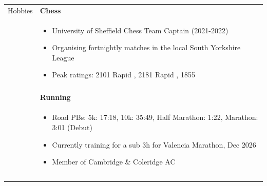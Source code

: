 \documentclass[11pt]{article}
\begin{document}
\begin{minipage}[t][0pt]{\linewidth}
\begin{tabular}[t]{p{2cm} p{14cm}}
	               {Hobbies}           &
	               \textbf{Chess}                                                                                                                                                                                                                                                                                                                                     \\ &
	               \begin{itemize}
		               \renewcommand{\labelitemi}{$\diamond$}
		               \item University of Sheffield Chess Team Captain (2021-2022)
		               \item Organising fortnightly matches in the local South Yorkshire League
		               \item Peak ratings: 2101 Rapid \href{https://www.chess.com/member/jamesluong}{\color{Blue}{chess.com}}, 2181 Rapid \href{https://lichess.org/@/courage23}{\color{Blue}{lichess}}, 1855 \href{https://rating.englishchess.org.uk/players/games?domain=S&year=ALL&show_games=on&show_ratings=on&ECF_code=343167J}{\color{Blue}{ECF}}
	               \end{itemize} \\ & \\ &

	               \textbf{Running}                                                                                                                                                                                                                                                                                                                                   \\ &
	               \begin{itemize}
		               \renewcommand{\labelitemi}{$\diamond$}
		               \item Road PBs: 5k: 17:18, 10k: 35:49, Half Marathon: 1:22, Marathon: 3:01 (Debut)
		               \item Currently training for a sub 3h for Valencia Marathon, Dec 2026
		               \item Member of Cambridge \& Coleridge AC

	               \end{itemize}                                                                                                                                                                                                                                                 \\ &                                                                                                                                                                                                                                                 \\ &


\end{tabular}
\end{minipage}
\end{document}
